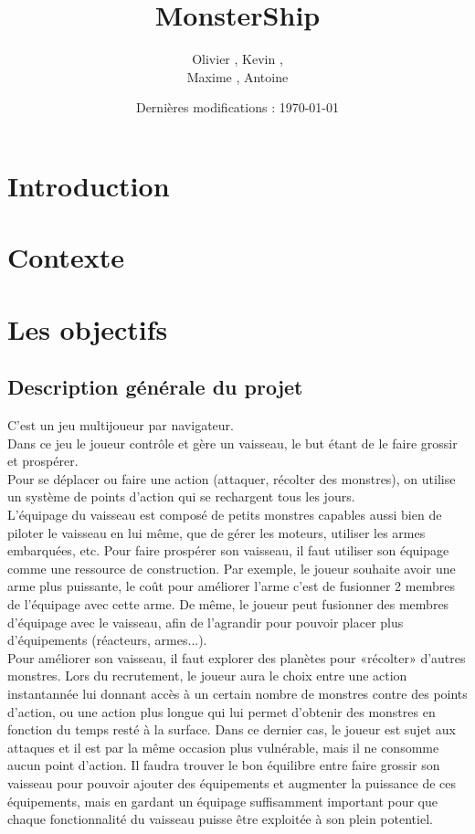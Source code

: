 \documentclass[a4paper,11pt]{report}
\title{MonsterShip\texttrademark }
\author{Olivier \bsc{Boissard}, Kevin \bsc{Boulala},\\
Maxime \bsc{Dubois}, Antoine \bsc{Lavier}}
\date{Dernières modifications : \today}
\begin{document}
\maketitle
\tableofcontents

\chapter{Introduction}


\chapter{Contexte}


\chapter{Les objectifs}
    \section{Description générale du projet}
    C'est un jeu multijoueur par navigateur.\\

    Dans ce jeu le joueur contrôle et gère un vaisseau, le but étant de le faire grossir et prospérer.\\

    Pour se déplacer ou faire une action (attaquer, récolter des monstres), on utilise un système de points d'action qui se rechargent tous les jours.\\

    L’équipage du vaisseau est composé de petits monstres capables aussi bien de piloter le vaisseau en lui même, que de gérer les moteurs, utiliser les armes embarquées, etc. Pour faire prospérer son vaisseau, il faut utiliser son équipage comme une ressource de construction. Par exemple, le joueur souhaite avoir une arme plus puissante, le coût pour améliorer l’arme c’est de fusionner 2 membres de l’équipage avec cette arme. De même, le joueur peut fusionner des membres d'équipage avec le vaisseau, afin de l'agrandir pour pouvoir placer plus d'équipements (réacteurs, armes...).\\

    Pour améliorer son vaisseau, il faut explorer des planètes pour «récolter» d’autres monstres. Lors du recrutement, le joueur aura le choix entre une action instantannée lui donnant accès à un certain nombre de monstres contre des points d'action, ou une action plus longue qui lui permet d'obtenir des monstres en fonction du temps resté à la surface. Dans ce dernier cas, le joueur est sujet aux attaques et il est par la même occasion plus vulnérable, mais il ne consomme aucun point d'action. Il faudra trouver le bon équilibre entre faire grossir son vaisseau pour pouvoir ajouter des équipements et augmenter la puissance de ces équipements, mais en gardant un équipage suffisamment important pour que chaque fonctionnalité du vaisseau puisse être exploitée à son plein potentiel.\\
\end{document}
